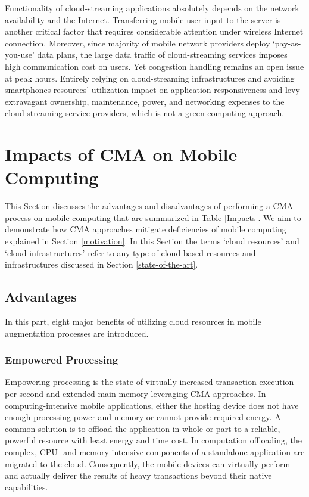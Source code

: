 \documentclass[publish]{IEEEtran}
\begin{document}
Functionality of cloud-streaming applications absolutely depends on the network availability and the Internet. Transferring mobile-user input to the server is another critical factor that requires considerable attention under wireless Internet connection. Moreover, since majority of mobile network providers deploy `pay-as-you-use' data plans, the large data traffic of cloud-streaming services imposes high communication cost on users. Yet congestion handling remains an open issue at peak hours. Entirely relying on cloud-streaming infrastructures and avoiding smartphones resources' utilization impact on application responsiveness and levy extravagant ownership, maintenance, power, and networking expenses to the cloud-streaming service providers, which is not a green computing approach.

\section{Impacts of CMA on Mobile Computing}   \label{impactofcma} 
This Section discusses the advantages and disadvantages of performing a CMA process on mobile computing that are summarized in Table \ref{Impacts}. We aim to demonstrate how CMA approaches mitigate deficiencies of mobile computing explained in Section \ref{motivation}. In this Section the terms `cloud resources' and `cloud infrastructures' refer to any type of cloud-based resources and infrastructures discussed in Section \ref{state-of-the-art}.

\subsection{Advantages}
In this part, eight major benefits of utilizing cloud resources in mobile augmentation processes are introduced. 

\subsubsection{Empowered Processing} \label{computingaugmentation}
Empowering processing is the state of virtually increased transaction execution per second and extended main memory leveraging CMA approaches. In computing-intensive mobile applications, either the hosting device does not have enough processing power and memory or cannot provide required energy. A common solution is to offload the application \textemdash in whole or part \textemdash to a reliable, powerful resource with least energy and time cost. In computation offloading, the complex, CPU- and memory-intensive components of a standalone application are migrated to the cloud. Consequently, the mobile devices can virtually perform and actually deliver the results of heavy transactions beyond their native capabilities. 
\end{document}

